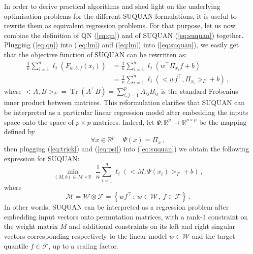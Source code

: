 \documentclass{article}
\newcommand{\RR}{\mathbb{R}} %
\newcommand{\Fcal}{\mathcal{F}}
\newcommand{\Mcal}{\mathcal{M}}
\newcommand{\Wcal}{\mathcal{W}}
\DeclareMathOperator{\Tr}{Tr}
\begin{document}
 In order to derive practical algorithms and shed light on the underlying optimisation problems for the different SUQUAN formulations, it is useful to rewrite them as equivalent regression problems. For that purpose, let us now combine the definition of QN (\ref{eq:qn}) and of SUQUAN (\ref{eq:suquan}) together. Plugging (\ref{eq:qn}) into (\ref{eq:lm}) and (\ref{eq:lm}) into (\ref{eq:suquan}), we easily get that the objective function of SUQUAN can be rewritten as:
\begin{equation}\label{eq:trick}
\begin{split}
\frac{1}{n}\sum_{i=1}^n \ell_i\left(F_{w,b,f}(x_i)\right) & = \frac{1}{n} \sum_{i=1}^n \ell_i\left(w^\top \Pi_{x_i} f+b\right) \\
&=  \frac{1}{n} \sum_{i=1}^n \ell_i\left(< w f^\top , \Pi_{x_i}>_F +b\right)  \,,
\end{split}
\end{equation}
where $<A,B>_F = \Tr (A^\top B) = \sum_{i,j=1}^p A_{ij} B_{ij}$ is the standard Frobenius inner product between matrices. This reformulation clarifies that SUQUAN can be interpreted as a particular linear regression model after embedding the inputs space onto the space of $p\times p$ matrices. Indeed, let $\Psi : \RR^p \rightarrow \RR^{p\times p}$ be the mapping defined by 
\begin{equation}\label{eq:psi}
\forall x \in\RR^p\,\quad \Psi(x) = \Pi_x\,,
\end{equation}
then plugging (\ref{eq:trick}) and (\ref{eq:psi}) into (\ref{eq:suquan}) we obtain the following expression for SUQUAN:
\begin{equation}\label{eq:suquan3}
\min_{(M,b)\in\Mcal\times \RR} \; \frac{1}{n} \sum_{i=1}^n \ell_i\left(<M , \Psi(x_i)>_F +b\right) \,,
\end{equation}
where 
$$
\Mcal = \Wcal \otimes \Fcal = \left\{ w f^\top\,:\, w\in\Wcal\,,\,f\in\Fcal\right\}\,.
$$
In other words, SUQUAN can be interpreted as a regression problem after embedding input vectors onto permutation matrices, with a rank-1 constraint on the weight matrix $M$ and additional constraints on its left and right singular vectors corresponding respectively to the linear model $w\in\Wcal$ and the target quantile $f \in \Fcal$, up to a scaling factor.
\end{document}
